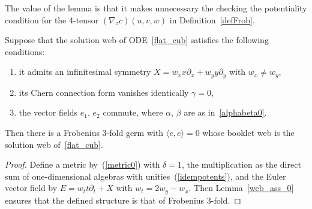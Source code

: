 The value of the lemma is that it makes unnecessary the checking the potentiality condition for the 4-tensor $(\nabla_z c)(u,v,w)$ in Def\/inition~\ref{defFrob}.
\begin{theorem}\label{web_Frobenius_0}
Suppose that the solution web of ODE~\eqref{flat_cub} satisfies the following conditions:
\begin{enumerate}\itemsep=0pt
\item[$1)$] it admits an infinitesimal symmetry $X=w_xx\partial_x+w_yy\partial_y$ with $w_x\ne w_y$,
\item[$2)$] its Chern connection form vanishes identically $\gamma=0$,
\item[$3)$] the vector fields $e_1$, $e_2$ commute, where $\alpha$, $\beta$ are as in~\eqref{alphabeta0}.
\end{enumerate}
Then there is a Frobenius $3$-fold germ with $\langle e,e\rangle=0$
whose booklet web is the solution web of~\eqref{flat_cub}.
\end{theorem}
\begin{proof}
Def\/ine a metric by~(\ref{metric0}) with $\delta=1$,
the multiplication as the direct sum of one-dimensional algebras with unities~(\ref{idempotents}),
and the Euler vector f\/ield by $E=w_tt\partial_t+X$ with $w_t=2w_y-w_x$.
Then Lemma~\ref{web_ass_0} ensures that the def\/ined structure is that of Frobenius \mbox{$3$-fold}.
\end{proof}
